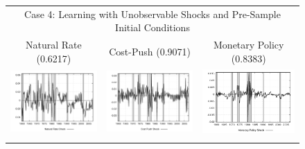 \begin{figure}
\begin{tabular}{ccc}
\multicolumn{3}{c}{Case 4: Learning with Unobservable Shocks and Pre-Sample Initial Conditions} \\ 
Natural Rate (0.6217) & Cost-Push (0.9071) & Monetary Policy (0.8383) \\
\includegraphics[scale=0.3]{results_wlsinit/natrateshock.png} & 
\includegraphics[scale=0.3]{results_wlsinit/costpushshock.png} & 
\includegraphics[scale=0.3]{results_wlsinit/mpshock.png} \\ \\ 
 
\end{tabular}
\end{figure}
